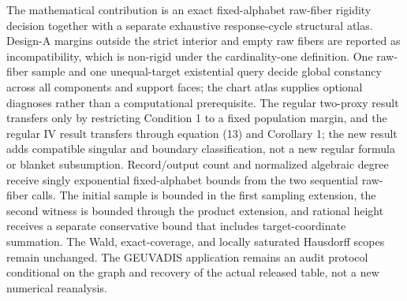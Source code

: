 \documentclass{article}
\begin{document}
The mathematical contribution is an exact fixed-alphabet raw-fiber rigidity decision together with a separate exhaustive response-cycle structural atlas. Design-A margins outside the strict interior and empty raw fibers are reported as incompatibility, which is non-rigid under the cardinality-one definition. One raw-fiber sample and one unequal-target existential query decide global constancy across all components and support faces; the chart atlas supplies optional diagnoses rather than a computational prerequisite. The regular two-proxy result transfers only by restricting Condition 1 to a fixed population margin, and the regular IV result transfers through equation (13) and Corollary 1; the new result adds compatible singular and boundary classification, not a new regular formula or blanket subsumption. Record/output count and normalized algebraic degree receive singly exponential fixed-alphabet bounds from the two sequential raw-fiber calls. The initial sample is bounded in the first sampling extension, the second witness is bounded through the product extension, and rational height receives a separate conservative bound that includes target-coordinate summation. The Wald, exact-coverage, and locally saturated Hausdorff scopes remain unchanged. The GEUVADIS application remains an audit protocol conditional on the graph and recovery of the actual released table, not a new numerical reanalysis.
\end{document}
